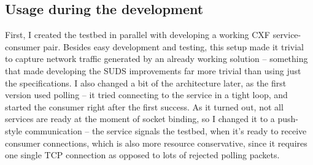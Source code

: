 \subsection{Usage during the development}

First, I created the testbed in parallel with developing a working CXF service-consumer pair. Besides easy development and testing, this setup made it trivial to capture network traffic generated by an already working solution -- something that made developing the SUDS improvements far more trivial than using just the specifications. I also changed a bit of the architecture later, as the first version used polling -- it tried connecting to the service in a tight loop, and started the consumer right after the first success. As it turned out, not all services are ready at the moment of socket binding, so I changed it to a push-style communication -- the service signals the testbed, when it's ready to receive consumer connections, which is also more resource conservative, since it requires one single TCP connection as opposed to lots of rejected polling packets.
